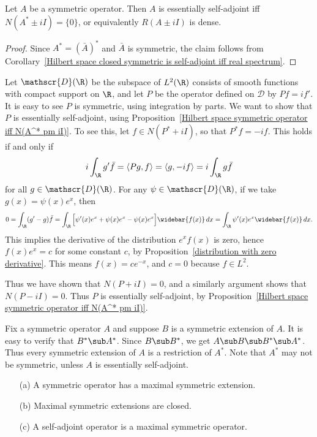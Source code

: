 \begin{proposition}\label{Hilbert space symmetric operator iff N(A^* pm iI)}
Let $A$ be a symmetric operator. Then $A$ is essentially self-adjoint iff $N(A^*\pm iI)=\{0\}$, or equivalently $R(A\pm iI)$ is dense.
\end{proposition}
\begin{proof}
Since $A^*=(\bar{A})^*$ and $\bar{A}$ is symmetric, the claim follows from Corollary~\ref{Hilbert space closed symmetric is self-adjoint iff real spectrum}.
\end{proof}
\begin{example}
Let $\mathscr{D}(\R)$ be the subspace of $L^2(\R)$ consists of smooth functions with compact support on $\R$, and let $P$ be the operator defined on $\mathscr{D}$ by $Pf=if'$. It is easy to see $P$ is symmetric, using integration by parts. We want to show that $P$ is essentially self-adjoint, using Proposition~\ref{Hilbert space symmetric operator iff N(A^* pm iI)}. To see this, let $f\in N(P^*+iI)$, so that $P^*f=-if$. This holds if and only if
\[i\int_\R g'\bar{f}=\langle Pg,f\rangle=\langle g,-if\rangle=i\int_\R g\bar{f}\]
for all $g\in\mathscr{D}(\R)$. For any $\psi\in\mathscr{D}(\R)$, if we take $g(x)=\psi(x)e^x$, then
\[0=\int_\R(g'-g)\bar{f}=\int_\R\Big[\psi'(x)e^x+\psi(x)e^x-\psi(x)e^x\Big]\widebar{f(x)}\,dx=\int_\R\psi'(x)e^{x}\widebar{f(x)}\,dx.\]
This implies the derivative of the distribution $e^xf(x)$ is zero, hence $f(x)e^x=c$ for some constant $c$, by Proposition~\ref{distribution with zero derivative}. This means $f(x)=ce^{-x}$, and $c=0$ because $f\in L^2$.\par
Thus we have shown that $N(P+iI)=0$, and a similarly argument shows that $N(P-iI)=0$. Thus $P$ is essentially self-adjoint, by Proposition~\ref{Hilbert space symmetric operator iff N(A^* pm iI)}.
\end{example}
Fix a symmetric operator $A$ and suppose $B$ is a symmetric extension of $A$. It is easy to verify that $B^*\sub A^*$. Since $B\sub B^*$, we get $A\sub B\sub B^*\sub A^*$. Thus every symmetric extension of $A$ is a restriction of $A^*$. Note that $A^*$ may not be symmetric, unless $A$ is essentially self-adjoint.
\begin{proposition}\label{Hilbert space symmetric operator maximal extension}
\mbox{}
\begin{itemize}
\item[(a)] A symmetric operator has a maximal symmetric extension.
\item[(b)] Maximal symmetric extensions are closed.
\item[(c)] A self-adjoint operator is a maximal symmetric operator. 
\end{itemize}
\end{proposition}
